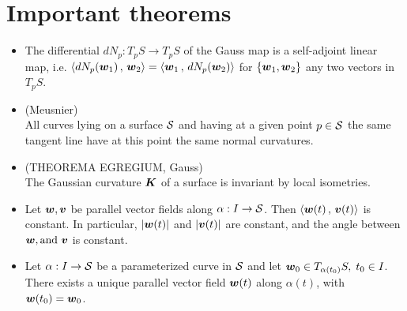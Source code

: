 \documentclass[11pt]{article}
\begin{document}
\section{Important theorems}
\begin{itemize}
\item \begin{proposition}\label{prop: Gauss_selfadj}
The differential $dN_{p}:  T_{p}S \rightarrow T_{p}S$ of the Gauss map is a self-adjoint linear map, i.e. $\left\langle dN_{p}(\boldsymbol{w}_{1})\,,\, \boldsymbol{w}_{2} \right\rangle = \left\langle \boldsymbol{w}_{1}\,,\, dN_{p}(\boldsymbol{w}_{2}) \right\rangle  $ for $\left\{\boldsymbol{w}_{1}, \boldsymbol{w}_{2}\right\}$ any two vectors in $T_{p}S$. 
\end{proposition}\vspace{10pt}

 \item \begin{theorem}(Meusnier) \label{th: meusnier}\\
All curves lying on a surface ${\mathcal S}$ and having at a given point $p\in {\mathcal S}$ the same tangent line have at this point the same normal curvatures. 
\end{theorem}\vspace{10pt}

 \item \begin{theorem} \label{th: Gauss_theorem}
(THEOREMA EGREGIUM, Gauss)\\
The Gaussian curvature $\boldsymbol{K}$ of a surface is invariant by local isometries. 
\end{theorem}\vspace{10pt}

\item \begin{proposition}\label{prop: para_transp}
Let $\boldsymbol{w}, \boldsymbol{v}$ be parallel vector fields along $\alpha: I\rightarrow {\mathcal S}$. Then $\left\langle \boldsymbol{w}(t)\,,\, \boldsymbol{v}(t) \right\rangle$ is constant.  In particular, $\left\lvert \boldsymbol{w}(t) \right\rvert$ and $\left\lvert \boldsymbol{v}(t) \right\rvert$ are constant, and the angle between $\boldsymbol{w}, \text{and }\boldsymbol{v}$ is constant. 
\end{proposition}\vspace{10pt}

 \item \begin{proposition}\label{prop: para_transp_curv}
Let $\alpha: I\rightarrow {\mathcal S}$ be a parameterized curve in ${\mathcal S}$ and let $\boldsymbol{w}_{0} \in T_{\alpha(t_{0})}S,\; t_{0}\in I$. There exists a unique parallel vector field $\boldsymbol{w}(t)$ along $\alpha(t)$, with $\boldsymbol{w}(t_{0}) = \boldsymbol{w}_{0}$. 
\end{proposition}


\end{itemize}
\end{document}
